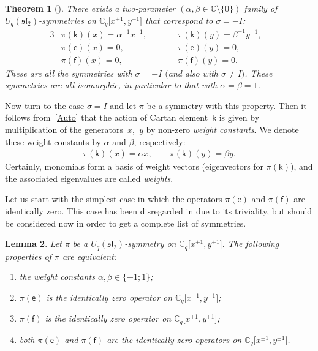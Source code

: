 \documentclass[10pt,a4paper]{amsart}
\numberwithin{equation}{section}
\newtheorem{Theorem}{Theorem}[section]
\newtheorem{Lemma}[Theorem]{Lemma}
\begin{document}
\begin{Theorem}[{\cite[Theorem 3.5, type (I)]{S}}]\label{sigma=-I}
There exists a two-parameter $(\alpha,\beta\in\mathbb{C}{\setminus}\{0\})$ family of $U_q(\mathfrak{sl}_2)$-symmetries on $\mathbb{C}_q\big[x^{\pm 1},y^{\pm 1}\big]$ that correspond to $\sigma=-I$:
\begin{alignat*}{3}
&\pi(\mathsf{k})(x)=\alpha^{-1}x^{-1}, \qquad && \pi(\mathsf{k})(y) =\beta^{-1}y^{-1}, &\\
& \pi(\mathsf{e})(x) =0,\qquad & & \pi(\mathsf{e})(y) =0, &\\
& \pi(\mathsf{f})(x) =0,\qquad && \pi(\mathsf{f})(y) =0. &
\end{alignat*}
These are all the symmetries with $\sigma=-I$ $($and also with $\sigma\ne I)$. These symmetries are all isomorphic, in particular to that with $\alpha=\beta=1$.
\end{Theorem}

Now turn to the case $\sigma=I$ and let $\pi$ be a symmetry with this property. Then it follows from~\eqref{Auto} that the action of Cartan element~$\mathsf{k}$ is given by multiplication of the generators~$x$,~$y$ by non-zero {\it weight constants}. We denote these weight constants by $\alpha$ and $\beta$, respectively:
\begin{gather*}\pi(\mathsf{k})(x)=\alpha x,\qquad\pi(\mathsf{k})(y)=\beta y.\end{gather*}
Certainly, monomials form a basis of weight vectors (eigenvectors for $\pi(\mathsf{k})$), and the associated eigenvalues are called {\it weights}.

Let us start with the simplest case in which the operators $\pi(\mathsf{e})$ and $\pi(\mathsf{f})$ are identically zero. This case has been disregarded in \cite{S} due to its triviality, but should be considered now in order to get a complete list of symmetries.

\begin{Lemma}\label{iz}Let $\pi$ be a $U_q(\mathfrak{sl}_2)$-symmetry on $\mathbb{C}_q\big[x^{\pm 1},y^{\pm 1}\big]$. The following properties of $\pi$ are equivalent:
\begin{enumerate}\itemsep=0pt
\item[$(i)$] the weight constants $\alpha,\beta\in\{-1;1\}$;
\item[$(ii)$] $\pi(\mathsf{e})$ is the identically zero operator on $\mathbb{C}_q\big[x^{\pm 1},y^{\pm 1}\big]$;
\item[$(iii)$] $\pi(\mathsf{f})$ is the identically zero operator on $\mathbb{C}_q\big[x^{\pm 1},y^{\pm 1}\big]$;
\item[$(iv)$] both $\pi(\mathsf{e})$ and $\pi(\mathsf{f})$ are the identically zero operators on $\mathbb{C}_q\big[x^{\pm 1},y^{\pm 1}\big]$.
\end{enumerate}
\end{Lemma}
\end{document}
